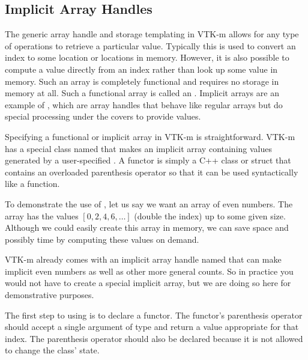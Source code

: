 \subsection{Implicit Array Handles}


The generic array handle and storage templating in VTK-m allows for
any type of operations to retrieve a particular value. Typically this is
used to convert an index to some location or locations in memory. However,
it is also possible to compute a value directly from an index rather than
look up some value in memory. Such an array is completely functional and
requires no storage in memory at all. Such a functional array is called an
. Implicit arrays are an example of
, which are array handles that behave like
regular arrays but do special processing under the covers to provide
values.

Specifying a functional or implicit array in VTK-m is straightforward.
VTK-m has a special class named  that makes
an implicit array containing values generated by a user-specified
.  A functor is simply a C++ class or
struct that contains an overloaded parenthesis operator so that it can be
used syntactically like a function.

To demonstrate the use of , let us say
we want an array of even numbers. The array has the values
$[0,2,4,6,\ldots]$ (double the index) up to some given size. Although we
could easily create this array in memory, we can save space and possibly
time by computing these values on demand.

\begin{didyouknow}
  VTK-m already comes with an implicit array handle named
   that can make implicit even numbers as
  well as other more general counts. So in practice you would not have to
  create a special implicit array, but we are doing so here for
  demonstrative purposes.
\end{didyouknow}

The first step to using  is to declare
a functor. The functor's parenthesis operator should accept a single
argument of type  and return a value appropriate for that index.
The parenthesis operator should also be declared  because
it is not allowed to change the class' state.

